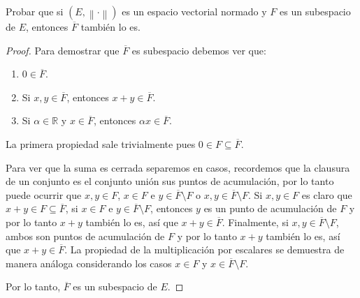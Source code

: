 \documentclass{article}
\theoremstyle{definition}
\newcommand{\R}{\mathbb{R}}
\newcommand{\norm}[1]{\left\lVert #1 \right\rVert}       %
\newcommand{\cl}[1]{\overline{#1}}                        %
\newcommand{\EN}[1][E]{(#1,\norm{\cdot})}                 %
\newenvironment{ejercicio}[1]{\begin{trivlist}
\item[\hskip \labelsep {\bfseries Ejercicio}\hskip \labelsep {\bfseries #1.}]}{\end{trivlist}}
\begin{document}
\vspace{0.5cm}

\begin{ejercicio}{7}
    Probar que si \( \EN \) es un espacio vectorial normado y \(F\) es un subespacio de \(E\), entonces \(\cl{F}\) también lo es.
\end{ejercicio}
\begin{proof}
    Para demostrar que \( \cl{F} \) es subespacio debemos ver que: \begin{enumerate}
        \item \( 0 \in \cl{F} \).
        \item Si \( x,y \in \cl{F} \), entonces \( x+y \in \cl{F} \).
        \item Si \( \alpha \in \R \) y \( x \in \cl{F} \), entonces \( \alpha x \in \cl{F} \).
    \end{enumerate}
    La primera propiedad sale trivialmente pues \( 0 \in F \subseteq \cl{F} \).

    Para ver que la suma es cerrada separemos en casos, recordemos que la clausura de un conjunto es el conjunto unión sus puntos de acumulación, por lo tanto puede ocurrir que \( x, y \in F \), \( x \in F \) e \( y \in \cl{F} \setminus F \) o \( x,y \in \cl{F} \setminus F \). Si \( x,y \in F \) es claro que \( x+y \in F \subseteq \cl{F} \), si \( x \in F \) e \( y \in \cl{F} \setminus F \), entonces \( y \) es un punto de acumulación de \( F \) y por lo tanto \( x+y \) también lo es, así que \( x+y \in \cl{F} \). Finalmente, si \( x,y \in \cl{F} \setminus F \), ambos son puntos de acumulación de \( F \) y por lo tanto \( x+y \) también lo es, así que \( x+y \in \cl{F} \). La propiedad de la multiplicación por escalares se demuestra de manera análoga considerando los casos \( x \in F \) y \( x \in \cl{F} \setminus F \).

    Por lo tanto, \( \cl{F} \) es un subespacio de \( E \).
\end{proof}

\vspace{0.5cm}
\end{document}

